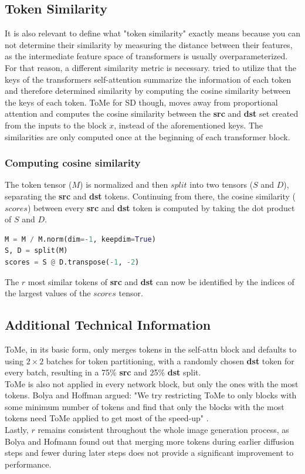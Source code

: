 \subsection{Token Similarity}
It is also relevant to define what "token similarity" exactly means because you can not determine their similarity by measuring the distance between their features, as the intermediate feature space of transformers is usually overparameterized.
For that reason, a different similarity metric is necessary. \cite{bolya2023tome} tried to utilize that the keys of the transformers self-attention summarize the information of each token and therefore determined similarity by computing the cosine similarity between the keys of each token. ToMe for SD though, moves away from proportional attention and computes the cosine similarity between the \textbf{src} and \textbf{dst} set created from the inputs to the block \(x\), instead of the aforementioned keys. The similarities are only computed once at the beginning of each transformer block.



\subsubsection*{Computing cosine similarity}
The token tensor (\(M\)) is normalized and then \(split\) into two tensors (\(S\) and \(D\)), separating the \textbf{src} and \textbf{dst} tokens.
Continuing from there, the cosine similarity (\(scores\)) between every \textbf{src} and \textbf{dst} token is computed by taking the dot product of \(S\) and \(D\).
\begin{lstlisting}[language=Python]
M = M / M.norm(dim=-1, keepdim=True)
S, D = split(M)
scores = S @ D.transpose(-1, -2)
\end{lstlisting}
The \(r\) most similar tokens of \textbf{src} and \textbf{dst} can now be identified by the indices of the largest values of the \(scores\) tensor.



\subsection{Additional Technical Information}
ToMe, in its basic form, only merges tokens in the self-attn block and defaults to using \(2 \times 2\) batches for token partitioning, with a randomly chosen \textbf{dst} token for every batch, resulting in a 75\% \textbf{src} and 25\% \textbf{dst} split. \\
ToMe is also not applied in every network block, but only the ones with the most tokens. Bolya and Hoffman argued:
"We try restricting ToMe to only blocks with some minimum number of tokens and find that only the blocks with the most tokens need ToMe applied to get most of the speed-up" \cite{bolya2023tomesd}.\\
Lastly, \(r\) remains consistent throughout the whole image generation process, as Bolya and Hofmann found out that merging more tokens during earlier diffusion steps and fewer during later steps does not provide a significant improvement to performance.



